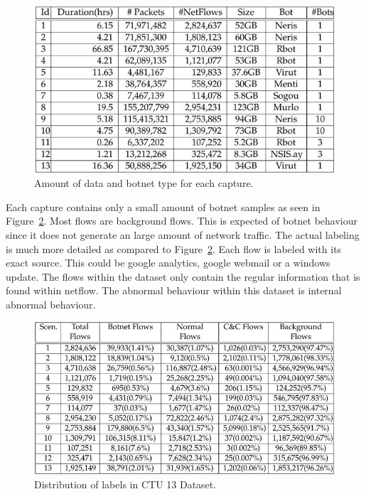  \begin{figure}[H]
\centering
\includegraphics[width=1\textwidth]{Figures/ctu13-2}
\decoRule
\caption[Amount of data and botnet type for each capture]{Amount of data and botnet type for each capture. \cite{garcia2014empirical}}
\label{fig:ctu13-2}
\end{figure}

\noindent Each capture contains only a small amount of botnet samples as seen in Figure~\ref{fig:ctu13-1}.  Most flows are background flows. This is expected of botnet behaviour since it does not generate an large amount of network traffic. The actual labeling is much more detailed as compared to Figure~\ref{fig:ctu13-1}. Each flow is labeled with its exact source. This could be google analytics, google webmail or a windows update. The flows within the dataset only contain the regular information that is found within netflow. The abnormal behaviour within this dataset is internal abnormal behaviour.

 \begin{figure}[H]
\centering
\includegraphics[width=1\textwidth]{Figures/ctu13-1}
\decoRule
\caption[Distribution of labels in CTU 13 Dataset]{Distribution of labels in CTU 13 Dataset. \cite{garcia2014empirical}}
\label{fig:ctu13-1}
\end{figure}


